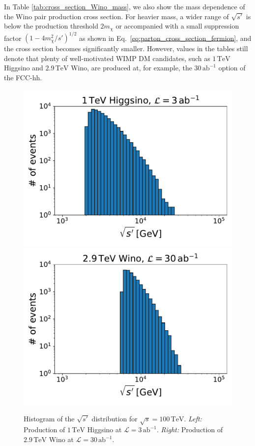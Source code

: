 \documentclass[12pt,twoside,book]{article}
\begin{document}
In Table \ref{tab:cross_section_Wino_mass}, we also show the mass dependence of the Wino pair production cross section.
For heavier mass, a wider range of $\sqrt{s'}$ is below the production threshold $2 m_{\chi}$ or accompanied with a small suppression factor $(1-4 m_\chi^2 / s')^{1/2}$ as shown in Eq.~\eqref{eq:parton_cross_section_fermion}, and the cross section becomes significantly smaller.
However, values in the tables still denote that plenty of well-motivated WIMP DM candidates, such as $1\,\mathrm{TeV}$ Higgsino and $2.9\,\mathrm{TeV}$ Wino, are produced at, for example, the $30\,\mathrm{ab}^{-1}$ option of the FCC-hh.

\begin{figure}[t]
  \centering
  \includegraphics[width=0.48\hsize]{invariant_mass_Higgsino.pdf}
  \includegraphics[width=0.48\hsize]{invariant_mass_Wino.pdf}
  \caption{
    Histogram of the $\sqrt{s'}$ distribution for $\sqrt{s} = 100\,\mathrm{TeV}$.
    \textit{Left:} Production of $1\,\mathrm{TeV}$ Higgsino at $\mathcal{L} = 3\,\mathrm{ab}^{-1}$.
    \textit{Right:} Production of $2.9\,\mathrm{TeV}$ Wino at $\mathcal{L} = 30\,\mathrm{ab}^{-1}$.}
  \label{fig:invariant_mass}
\end{figure}
\end{document}
